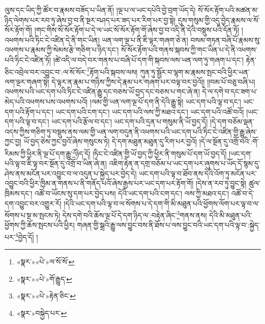 ལུས་དང་ཡིད་ཀྱི་ཚོར་བ་རྣམས་བཟོད་པ་ཡིན་ནོ། །ལྔ་པ་ལ་ཡང་དཔེའི་བྱེ་བྲག་ཡོད་དེ། སོ་སོར་རྟོག་པའི་མཚན་མ་ཉིད་ལེགས་པར་རབ་ཏུ་ཞེས་བྱ་བ་ནི་སྔར་བཤད་པར་ཟད་པར་རིག་པར་བྱ་སྟེ། དུས་གསུམ་གྱི་འདུ་བྱེད་རྣམས་ལ་སོ་སོར་རྟོག་གོ། །གང་གིས་སོ་སོར་རྟོག་པ་དེ་ལ་ཡང་སོ་སོར་རྟོག་གོ་ཞེས་བྱ་བ་འདི་ནི་དེའི་བསྡུས་པའི་དོན་ཏོ། །འཕགས་པའི་ཏིང་ངེ་འཛིན་དེ་ནི་གང་ཡིན། ཡན་ལག་ལྔ་པ་ནི་ཇི་ལྟར་གཞག་ཅེ་ན། བསམ་གཏན་བཞི་པོ་རྣམས་སུ་འཕགས་པ་རྣམས་ཀྱི་སེམས་རྩེ་གཅིག་པ་ཉིད་དང་། སོ་སོར་རྟོག་པའི་གནས་སྐབས་ཀྱི་གང་ཡིན་པ་དེ་ནི་འཕགས་པའི་ཏིང་ངེ་འཛིན་ཏོ། །ཚེ་འདི་ལ་བདེ་བར་གནས་པ་བཞི་པོ་དག་གི་སྐབས་ལས་ཡན་ལག་ཏུ་གཞག་པ་དང་། རྟེན་ཅིང་འབྲེལ་བར་འབྱུང་བ་:ལ་སོ་སོར་\footnote{«སྣར་»«པེ་»ལ་སོ་སོ་}རྟོག་པའི་སྐབས་ལས། ཀུན་ཏུ་སྦྱོར་བ་ལྷག་མ་རྣམས་སྤང་བའི་ཕྱིར་ཡན་ལག་ལྔར་གཞག་སྟེ། དེ་ལྟར་ན་རྣམ་པ་གཉིས་ཀྱིས་དེ་རྣམ་པར་གཞག་པར་བལྟ་བར་བྱའོ།། །།བམ་པོ་བཅུ་བཞི་པ། འཕགས་པའི་ཡང་དག་པའི་ཏིང་ངེ་འཛིན་རྒྱུ་དང་བཅས་ཡོ་བྱད་དང་བཅས་པ་གང་ཞེ་ན། དེ་ལ་དགེ་བ་དང་ཟག་པ་མེད་པའི་འཕགས་པས་འཕགས་པའོ། །ལམ་གྱི་ཡན་ལག་ལྔ་པོ་དག་ནི་དེའི་རྒྱུ་སྟེ། ཡང་དག་པའི་ལྟ་བ་དང་། ཡང་དག་པའི་རྟོག་པ་དང་། ཡང་དག་པའི་ངག་དང་། ཡང་དག་པའི་ལས་ཀྱི་མཐའ་དང་། ཡང་དག་པའི་འཚོ་བའོ། །ཡང་དག་པའི་ལྟ་བ་དང་། ཡང་དག་པའི་རྩོལ་བ་དང་། ཡང་དག་པའི་དྲན་པ་གསུམ་ནི་ཡོ་བྱད་དོ། །དེ་དག་བཅོམ་ལྡན་འདས་ཀྱིས་གཅིག་ཏུ་བསྡུས་ནས་ལམ་གྱི་ཡན་ལག་བདུན་ནི་འཕགས་པའི་ཡང་དག་པའི་ཏིང་ངེ་འཛིན་གྱི་རྒྱུ་ཞེས་ཀྱང་བྱ། ཡོ་བྱད་ཅེས་ཀྱང་བྱའོ་ཞེས་གསུངས་ཏེ། དེ་དག་མཐུན་མཐུན་དུ་རིག་པར་བྱའོ། །དེ་ལ་སྔོན་དུ་འགྲོ་བའི་:གོ་རིམས་ཀྱི་ཕྱིར་ནི་ལྔ་པོ་དག་རྒྱུ་\footnote{«སྣར་»«པེ་»གོ་རྒྱུད་}ཉིད་དོ། །ཏིང་ངེ་འཛིན་གྱི་ཡོ་བྱད་ཀྱི་ཕྱིར་ནི་གསུམ་པོ་དག་ཡོ་བྱད་དོ། །ཡང་དག་པའི་ལྟ་བ་ཇི་ལྟ་བར་སྔོན་དུ་འགྲོ་བ་ཡིན་ཞེ་ན། འཇིག་རྟེན་ན་དགྲ་བཅོམ་པ་ཡང་དག་པར་ཞུགས་པ་ཡོད་དོ་སྙམ་དུ་ཤེས་ནས་མངོན་པར་འབྱུང་བ་ལ་འདུན་པ་སྐྱེད་པར་བྱེད་དེ། ཡང་དག་པའི་ལྟ་བ་ཐོབ་ནས་དེའི་འོག་ཏུ་མངོན་པར་འབྱུང་བའི་ཕྱིར་ཁྱིམ་ན་གནས་པ་ནི་གནོད་པའོ་ཞེས་རྒྱས་པར་ཡང་དག་པར་རྟོག་གོ། །དེས་ན་རབ་ཏུ་བྱུང་སྟེ། ཚུལ་ཁྲིམས་དང་། འཚོ་བ་ཡོངས་སུ་དག་པར་བྱེད་པས། དེའི་ཡང་དག་པའི་ངག་དང་། ལས་ཀྱི་མཐའ་དང་། འཚོ་བ་དེ་དག་འབྱུང་བར་འགྱུར་རོ། །དེའི་ཡང་དག་པའི་ལྟ་བ་ལ་སོགས་པ་དེ་དག་གི་མི་མཐུན་པའི་ཕྱོགས་ལོག་པར་ལྟ་བ་ལ་སོགས་པ་སྔ་མ་སྤངས་ཏེ། དེས་དགེ་བའི་ཆོས་ལྔ་པོ་དེ་དག་ཉིད་ལ་:བརྟེན་ཞིང་\footnote{«སྣར་»«པེ་»རྟེན་ཅིང་}གནས་ནས། དེའི་མི་མཐུན་པའི་ཕྱོགས་ཀྱི་ཆོས་སྤངས་པའི་ཕྱིར། གཞན་གྱི་སྒྲའི་རྒྱུ་ལས་བྱུང་བས་ནི་ཐོས་པ་ལས་བྱུང་བའི་ཡང་དག་པའི་ལྟ་བ་:སྐྱེད་པར་\footnote{«སྣར་»བསྐྱེད་པར་}བྱེད་དོ། །
